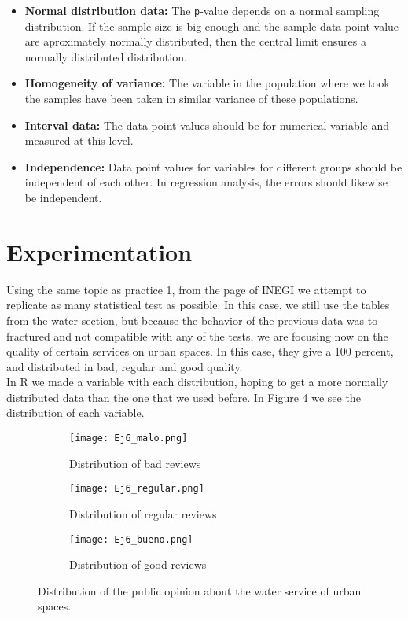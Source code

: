 \documentclass{article}
\begin{document}
\begin{itemize}\label{list2}
\item \textbf{Normal distribution data:} The \texttt{p}-value depends on a normal sampling distribution. If the sample size is big enough and the sample data point value are aproximately normally distributed, then the central limit ensures a normally distributed distribution.
\item \textbf{Homogeneity of variance:} The variable in the population where we took the samples have been taken in similar variance of these populations.
\item \textbf{Interval data:} The data point values should be for numerical variable and measured at this level.
\item \textbf{Independence:} Data point values for variables for different groups should be independent of each other. In regression analysis, the errors should likewise be independent.
\end{itemize}

\section{Experimentation}

Using the same topic as practice 1,  from the page of INEGI \cite{inegi} we attempt to replicate as many statistical test as possible. In this case, we still use the tables from the water section, but because the behavior of the previous data was to fractured and not compatible with any of the tests, we are focusing now on the quality of certain services on urban spaces. In this case, they give a 100 percent, and distributed in bad, regular and good quality. \\

In R we made a variable with each distribution, hoping to get a more normally distributed data than the one that we used before. In Figure \ref{extra} we see the distribution of each variable. \\

\begin{figure}[]
\begin{subfigure}{.3\textwidth}
  \centering
  \texttt{[image: Ej6\_malo.png]}  
  \caption{Distribution of bad reviews }
  \label{extra1}
\end{subfigure}
\begin{subfigure}{.3\textwidth}
  \centering
  \texttt{[image: Ej6\_regular.png]}  
  \caption{Distribution of regular reviews}
  \label{extra2}
\end{subfigure}
\begin{subfigure}{.3\textwidth}
  \centering
  \texttt{[image: Ej6\_bueno.png]}  
  \caption{Distribution of good reviews}
  \label{extra3}
\end{subfigure}
\caption{Distribution of the public opinion about the water service of urban spaces.}
\label{extra}
\end{figure}
\end{document}
